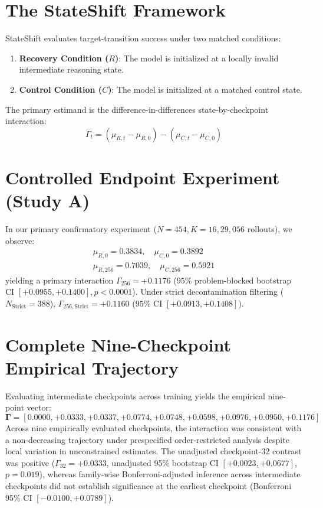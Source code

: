 \documentclass[11pt]{article}
\begin{document}
\section{The StateShift Framework}
StateShift evaluates target-transition success under two matched conditions:
\begin{enumerate}
    \item \textbf{Recovery Condition ($R$)}: The model is initialized at a locally invalid intermediate reasoning state.
    \item \textbf{Control Condition ($C$)}: The model is initialized at a matched control state.
\end{enumerate}

The primary estimand is the difference-in-differences state-by-checkpoint interaction:
\begin{equation}
\Gamma_t = (\mu_{R,t} - \mu_{R,0}) - (\mu_{C,t} - \mu_{C,0})
\end{equation}

\section{Controlled Endpoint Experiment (Study A)}
In our primary confirmatory experiment ($N=454, K=16, 29,056$ rollouts), we observe:
\begin{align}
\mu_{R,0} = 0.3834, \quad \mu_{C,0} = 0.3892 \\
\mu_{R,256} = 0.7039, \quad \mu_{C,256} = 0.5921
\end{align}
yielding a primary interaction $\Gamma_{256} = \mathbf{+0.1176}$ ($95\%$ problem-blocked bootstrap CI $[+0.0955, +0.1400], p < 0.0001$). Under strict decontamination filtering ($N_{\text{Strict}}=388$), $\Gamma_{256,\text{Strict}} = \mathbf{+0.1160}$ ($95\%$ CI $[+0.0913, +0.1408]$).

\section{Complete Nine-Checkpoint Empirical Trajectory}
Evaluating intermediate checkpoints across training yields the empirical nine-point vector:
\begin{equation}
\mathbf{\Gamma} = [0.0000, +0.0333, +0.0337, +0.0774, +0.0748, +0.0598, +0.0976, +0.0950, +0.1176]
\end{equation}
Across nine empirically evaluated checkpoints, the interaction was consistent with a non-decreasing trajectory under prespecified order-restricted analysis despite local variation in unconstrained estimates. The unadjusted checkpoint-32 contrast was positive ($\Gamma_{32} = +0.0333$, unadjusted 95\% bootstrap CI $[+0.0023, +0.0677]$, $p = 0.019$), whereas family-wise Bonferroni-adjusted inference across intermediate checkpoints did not establish significance at the earliest checkpoint (Bonferroni 95\% CI $[-0.0100, +0.0789]$).
\end{document}

